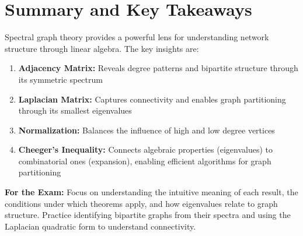 \documentclass[11pt]{article}
\begin{document}
\section{Summary and Key Takeaways}

Spectral graph theory provides a powerful lens for understanding network structure through linear algebra. The key insights are:

\begin{enumerate}
\item \textbf{Adjacency Matrix:} Reveals degree patterns and bipartite structure through its symmetric spectrum
\item \textbf{Laplacian Matrix:} Captures connectivity and enables graph partitioning through its smallest eigenvalues
\item \textbf{Normalization:} Balances the influence of high and low degree vertices
\item \textbf{Cheeger's Inequality:} Connects algebraic properties (eigenvalues) to combinatorial ones (expansion), enabling efficient algorithms for graph partitioning
\end{enumerate}

\textbf{For the Exam:} Focus on understanding the intuitive meaning of each result, the conditions under which theorems apply, and how eigenvalues relate to graph structure. Practice identifying bipartite graphs from their spectra and using the Laplacian quadratic form to understand connectivity.
\end{document}
